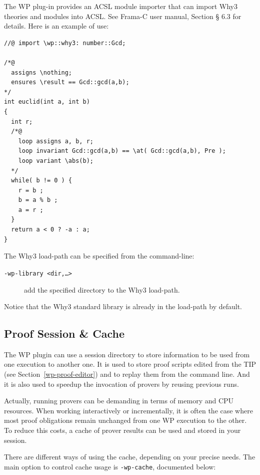 The \textsf{WP} plug-in provides an \textsf{ACSL} module importer that
can import \textsf{Why3} theories and modules into \textsf{ACSL}.
See \textsf{Frama-C} user manual, Section § 6.3 for details.
Here is an example of use:

\begin{lstlisting}
//@ import \wp::why3: number::Gcd;

/*@
  assigns \nothing;
  ensures \result == Gcd::gcd(a,b);
*/
int euclid(int a, int b)
{
  int r;
  /*@
    loop assigns a, b, r;
    loop invariant Gcd::gcd(a,b) == \at( Gcd::gcd(a,b), Pre );
    loop variant \abs(b);
  */
  while( b != 0 ) {
    r = b ;
    b = a % b ;
    a = r ;
  }
  return a < 0 ? -a : a;
}
\end{lstlisting}

\noindent
The Why3 load-path can be specified from the command-line:
\begin{description}
  \item[\tt -wp-library <dir,\ldots>] add the specified directory to the Why3 load-path.
\end{description}

\noindent
Notice that the Why3 standard library is already in the load-path by default.

\clearpage
\subsection{Proof Session \& Cache}
\label{wp-cache}

The \textsf{WP} plugin can use a session directory to store information to be used from one execution to another one.
It is used to store proof scripts edited from the TIP (see Section~\ref{wp-proof-editor}) and to replay them from the command line.
And it is also used to speedup the invocation of provers by reusing previous runs.

Actually, running provers can be demanding in terms of memory and CPU resources. When working
interactively or incrementally, it is often the case where most proof obligations remain unchanged
from one \textsf{WP} execution to the other. To reduce this costs, a cache of prover results can be used
and stored in your session.

There are different ways of using the cache, depending on your precise needs.
The main option to control cache usage is \verb+-wp-cache+, documented below:

